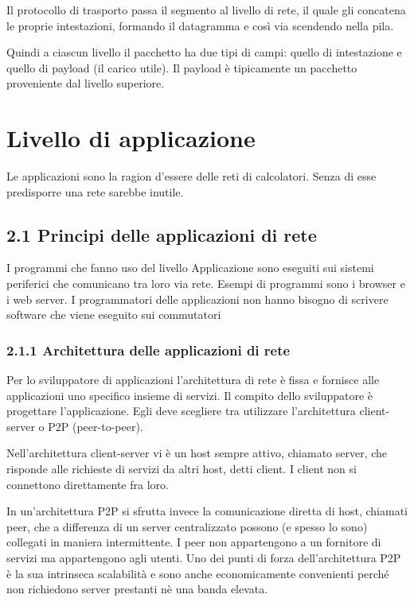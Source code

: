 \documentclass{book}
\begin{document}
Il protocollo di trasporto passa il segmento al livello di rete, il quale gli concatena le proprie intestazioni, formando il datagramma e così via scendendo nella pila.

Quindi a ciascun livello il pacchetto ha due tipi di campi: quello di intestazione e quello di payload (il carico utile). Il payload è tipicamente un pacchetto proveniente dal livello superiore.

\chapter{Livello di applicazione}
Le applicazioni sono la ragion d'essere delle reti di calcolatori. Senza di esse predisporre una rete sarebbe inutile.

\section*{2.1 Principi delle applicazioni di rete}
I programmi che fanno uso del livello Applicazione sono eseguiti sui sistemi periferici che comunicano tra loro via rete. Esempi di programmi sono i browser e i web server. I programmatori delle applicazioni non hanno bisogno di scrivere software che viene eseguito sui commutatori

\subsection*{2.1.1 Architettura delle applicazioni di rete}
Per lo sviluppatore di applicazioni l'architettura di rete è fissa e fornisce alle applicazioni uno specifico insieme di servizi. Il compito dello sviluppatore è progettare l'applicazione. Egli deve scegliere tra utilizzare l'architettura client-server o P2P (peer-to-peer).

Nell'architettura client-server vi è un host sempre attivo, chiamato server, che risponde alle richieste di servizi da altri host, detti client. I client non si connettono direttamente fra loro.

In un'architettura P2P si sfrutta invece la comunicazione diretta di host, chiamati peer, che a differenza di un server centralizzato possono (e spesso lo sono) collegati in maniera intermittente. I peer non appartengono a un fornitore di servizi ma appartengono agli utenti. Uno dei punti di forza dell'architettura P2P è la sua intrinseca scalabilità e sono anche economicamente convenienti perché non richiedono server prestanti nè una banda elevata.
\end{document}
